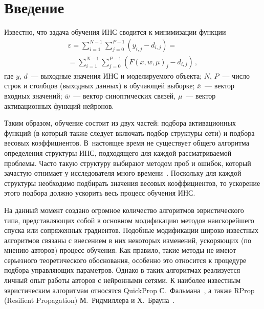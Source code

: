  \begin{multicols}{2}

 \label{st\stat}



\section{Введение}

 Известно, что задача обучения ИНС сводится к
минимизации функции
\begin{multline}
\varepsilon = \sum\limits_{i=1}^{N-1} \sum\limits_{j=0}^{P-1} \left ( y_{i,j}-d_{i,j}\right)={}\\
{}=
\sum\limits_{i=1}^{N-1} \sum\limits_{j=0}^{P-1} \left ( F(x,w,\mu)_j-d_{i,j}\right )\,,
\label{e1kr}
\end{multline}
где $y$, $d$~--- выходные значения ИНС и моделируемого объекта; $N$, $P$~--- число строк
и столбцов (выходных данных) в обучающей выборке; $\overline{x}$~--- вектор входных
значений; $\overline{w}$~--- вектор синоптических связей, $\mu$~--- вектор активационных
функций нейронов.

Таким образом, обучение состоит из двух частей: подбора
активационных функций (в который также следует включать подбор структуры сети) и
подбора весовых коэффициентов. В~настоящее время не существует общего алгоритма
определения структуры ИНС, подходящего для каждой рассматриваемой проблемы. Часто
такую структуру выбирают методом проб и ошибок, который зачастую отнимает у
исследователя много времени~\cite{2kr}. Поскольку для каждой структуры необходимо
подбирать значения весовых коэффициентов, то ускорение этого подбора должно ускорить
весь процесс обучения ИНС.

 На данный момент создано огромное количество алгоритмов эвристического типа,
представляющих собой в основном модификацию методов наи\-ско\-рей\-шего спуска или
сопряженных градиентов. Подобные модификации широко известных алгоритмов связаны с
внесением в них некоторых изменений, ускоряющих (по мнению авторов) процесс обучения.
Как правило, такие методы не имеют серьезного теоретического обоснования, особенно это
относится к процедуре подбора управ\-ля\-ющих параметров. Однако в таких алгоритмах\linebreak
реализуется личный опыт работы авторов с ней\-ронными сетями. К наиболее известным
эвристическим алгоритмам относятся QuickProp С.~Фальмана~\cite{8kr}, а также RProp (Resilient Propagation)\linebreak
М.~Ридмиллера и Х.~Брауна~\cite{7kr}.


\end{multicols}
